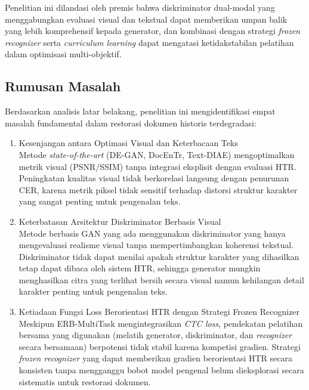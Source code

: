 Penelitian ini dilandasi oleh premis bahwa diskriminator dual-modal yang menggabungkan evaluasi visual dan tekstual dapat memberikan umpan balik yang lebih komprehensif kepada generator, dan kombinasi dengan strategi \textit{frozen recognizer} serta \textit{curriculum learning} dapat mengatasi ketidakstabilan pelatihan dalam optimisasi multi-objektif.

\subsection{Rumusan Masalah}
\label{subsec:rumusan-masalah}

Berdasarkan analisis latar belakang, penelitian ini mengidentifikasi empat masalah fundamental dalam restorasi dokumen historis terdegradasi:

\begin{enumerate}[leftmargin=1.5em, labelsep=0.5em, itemindent=0pt, noitemsep, topsep=0pt]
      \item Kesenjangan antara Optimasi Visual dan Keterbacaan Teks \\
            Metode \textit{state-of-the-art} (DE-GAN, DocEnTr, Text-DIAE) mengoptimalkan metrik visual (PSNR/SSIM) tanpa integrasi eksplisit dengan evaluasi HTR. Peningkatan kualitas visual tidak berkorelasi langsung dengan penurunan CER, karena metrik piksel tidak sensitif terhadap distorsi struktur karakter yang sangat penting untuk pengenalan teks.

      \item Keterbatasan Arsitektur Diskriminator Berbasis Visual \\
            Metode berbasis GAN yang ada menggunakan diskriminator yang hanya mengevaluasi realisme visual tanpa mempertimbangkan koherensi tekstual. Diskriminator tidak dapat menilai apakah struktur karakter yang dihasilkan tetap dapat dibaca oleh sistem HTR, sehingga generator mungkin menghasilkan citra yang terlihat bersih secara visual namun kehilangan detail karakter penting untuk pengenalan teks.

      \item Ketiadaan Fungsi Loss Berorientasi HTR dengan Strategi Frozen Recognizer \\
            Meskipun ERB-MultiTask mengintegrasikan \textit{CTC loss}, pendekatan pelatihan bersama yang digunakan (melatih generator, diskriminator, dan \textit{recognizer} secara bersamaan) berpotensi tidak stabil karena kompetisi gradien. Strategi \textit{frozen recognizer} yang dapat memberikan gradien berorientasi HTR secara konsisten tanpa mengganggu bobot model pengenal belum dieksplorasi secara sistematis untuk restorasi dokumen.


\end{enumerate}
